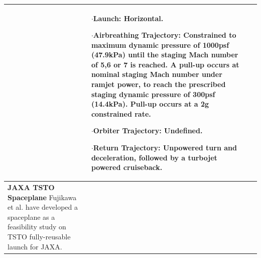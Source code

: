 {\begin{landscape}
\begin{xltabular}{\linewidth}{|X|X|X|}
	
	&\small
	
	$\cdot$\textbf{Launch:} Horizontal.
	
	$\cdot$\textbf{Airbreathing Trajectory:} Constrained to maximum dynamic pressure of 1000psf (47.9kPa) until the staging Mach number of 5,6 or 7 is reached. A pull-up occurs at nominal staging Mach number under ramjet power, to reach the prescribed staging dynamic pressure of 300psf (14.4kPa). Pull-up occurs at a 2g constrained rate. 
	
	$\cdot$\textbf{Orbiter Trajectory:} Undefined.
	
	$\cdot$\textbf{Return Trajectory:} Unpowered turn and deceleration, followed by a turbojet powered cruiseback. 
	\\
	
	
	\hline \small 
	\textbf{JAXA TSTO Spaceplane}\cite{Fujikawa2017}\newline\newline
	Fujikawa et al.\cite{Fujikawa2017} have developed a spaceplane as a feasibility study on TSTO fully-reusable launch for JAXA. 
	
	&\small
	

\end{xltabular}
\end{landscape}}
